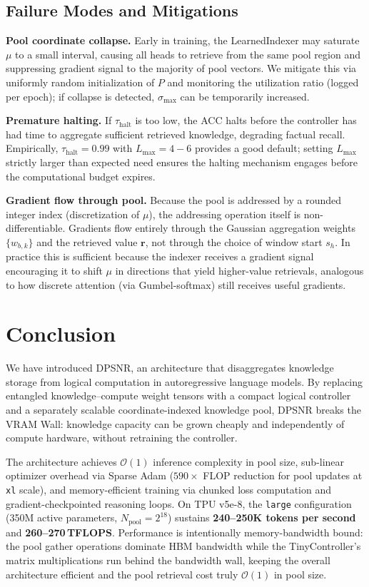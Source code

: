 \documentclass[11pt]{article}
\begin{document}
\subsection{Failure Modes and Mitigations}

\textbf{Pool coordinate collapse.}
Early in training, the LearnedIndexer may saturate $\mu$ to a small interval,
causing all heads to retrieve from the same pool region and suppressing gradient
signal to the majority of pool vectors.
We mitigate this via uniformly random initialization of $P$ and monitoring
the utilization ratio (logged per epoch); if collapse is detected,
$\sigma_{\max}$ can be temporarily increased.

\textbf{Premature halting.}
If $\tau_{\mathrm{halt}}$ is too low, the ACC halts before the controller
has had time to aggregate sufficient retrieved knowledge, degrading factual
recall.
Empirically, $\tau_{\mathrm{halt}} = 0.99$ with $L_{\max} = 4{-}6$ provides
a good default; setting $L_{\max}$ strictly larger than expected need ensures
the halting mechanism engages before the computational budget expires.

\textbf{Gradient flow through pool.}
Because the pool is addressed by a rounded integer index (discretization of
$\mu$), the addressing operation itself is non-differentiable.
Gradients flow entirely through the Gaussian aggregation weights
$\{w_{b,k}\}$ and the retrieved value $\mathbf{r}$, not through the choice
of window start $s_h$.
In practice this is sufficient because the indexer receives a gradient signal
encouraging it to shift $\mu$ in directions that yield higher-value retrievals,
analogous to how discrete attention (via Gumbel-softmax) still receives
useful gradients.

\section{Conclusion}
\label{sec:conclusion}

We have introduced DPSNR, an architecture that disaggregates knowledge storage
from logical computation in autoregressive language models.
By replacing entangled knowledge--compute weight tensors with a compact logical
controller and a separately scalable coordinate-indexed knowledge pool,
DPSNR breaks the VRAM Wall: knowledge capacity can be grown cheaply and
independently of compute hardware, without retraining the controller.

The architecture achieves $\mathcal{O}(1)$ inference complexity in pool size,
sub-linear optimizer overhead via Sparse Adam ($590{\times}$ FLOP reduction for
pool updates at \texttt{xl} scale), and memory-efficient training via chunked
loss computation and gradient-checkpointed reasoning loops.
On TPU v5e-8, the \texttt{large} configuration (350M active parameters,
$N_{\text{pool}}=2^{18}$) sustains \textbf{240--250K tokens per second} and
\textbf{260--270\,TFLOPS}.
Performance is intentionally memory-bandwidth bound: the pool gather operations
dominate HBM bandwidth while the TinyController's matrix multiplications run
behind the bandwidth wall, keeping the overall architecture efficient and
the pool retrieval cost truly $\mathcal{O}(1)$ in pool size.
\end{document}
